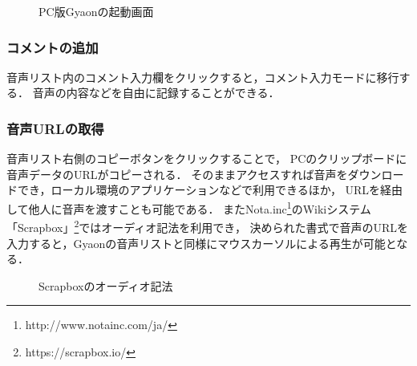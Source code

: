 \begin{figure}[H]
\centering
{}
\caption{PC版Gyaonの起動画面}
\label{gyaon}
\end{figure}

\subsubsection{コメントの追加}
音声リスト内のコメント入力欄をクリックすると，コメント入力モードに移行する．
音声の内容などを自由に記録することができる．

\subsubsection{音声URLの取得}
音声リスト右側のコピーボタンをクリックすることで，
PCのクリップボードに音声データのURLがコピーされる．
そのままアクセスすれば音声をダウンロードでき，ローカル環境のアプリケーションなどで利用できるほか，
URLを経由して他人に音声を渡すことも可能である．
またNota.inc\footnote{\textsf{http://www.notainc.com/ja/}}のWikiシステム
「Scrapbox」\footnote{\textsf{https://scrapbox.io/}}ではオーディオ記法を利用でき，
決められた書式で音声のURLを入力すると，Gyaonの音声リストと同様にマウスカーソルによる再生が可能となる．

\begin{figure}[H]
\centering
{}
\caption{Scrapboxのオーディオ記法}
\label{scrapbox}
\end{figure}

